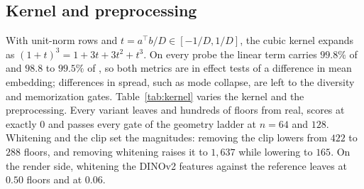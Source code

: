 \subsection{Kernel and preprocessing}
\label{app:kernel}

With unit-norm rows and $t = a^{\top}b/D \in [-1/D, 1/D]$, the cubic kernel expands as
$(1+t)^3 = 1 + 3t + 3t^2 + t^3$. On every probe the linear term carries $99.8\%$ of \mvkid{}
and $98.8$ to $99.5\%$ of \vkid{}, so both metrics are in effect tests of a difference in mean
embedding; differences in spread, such as mode collapse, are left to the diversity and
memorization gates. Table~\ref{tab:kernel} varies the kernel and the preprocessing. Every
\vkid{} variant leaves \solidify{} and \hollow{} hundreds of floors from real, scores
\matshuffle{} at exactly $0$ and passes every gate of the geometry ladder at $n{=}64$ and
$128$. Whitening and the clip set the magnitudes: removing the clip lowers \solidify{} from
$422$ to $288$ floors, and removing whitening raises it to $1{,}637$ while lowering
\growshell{} to $165$. On the render side, whitening the DINOv2 features against the
reference leaves \solidify{} at $0.50$ floors and \hollow{} at $0.06$.

\begin{table}[h]
\centering
\small
\setlength{\tabcolsep}{3.5pt}
\caption{\textbf{Kernel and preprocessing ablation.} Separations in each variant's own noise
floor (the bench estimator's expected value, so the base \vkid{} row reads $422$ where the
card's $48$-draw floor gives $444$), $n{=}256$, $399$-build reference. Gates: the geometry
ladder at $n{=}64$ and $128$; $^\ast$the render ladder at $n{=}64$.}
\label{tab:kernel}
\end{table}
